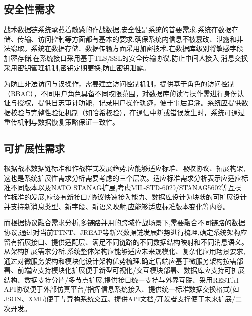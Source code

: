 \subsection{安全性需求}
战术数据链系统承载着敏感的作战数据,安全性是系统的首要需求,系统在数据存储、传输、访问控制等方面都有基本的要求,确保系统内信息不被篡改、泄露和非法窃取\cite{Collins_TTNT_immersion_2020}。系统在数据存储、数据传输方面采用加密技术,在数据库级别将敏感字段加密存储,在系统接口采用基于TLS/SSL的安全传输协议,防止中间人接入,消息交换采用密钥管理机制,密钥定期更换,防止密钥泄露\cite{Euromids_2025_contract}。

为防止非法访问与误操作，需要建立访问控制机制，提供基于角色的访问控制（RBAC），不同用户角色具备不同权限范围，对数据库的读写操作需进行身份认证与授权，提供日志审计功能，记录用户操作轨迹，便于事后追溯\cite{GovConWire_Euromids_2025}。系统应提供数据校验与完整性验证机制（如哈希校验），在通信中断或错误发生时，系统可通过重传机制与数据恢复策略保证一致性\cite{musumeci_2014_ietrsn_pulseblank,borio_2013_ietspr_pulseblanking,houdzoumis2009_jn,wu_2016_taes_dme_wp,huo_2015_ieeecl_meb,huo_2015_comex_mixed_interference,mitch_2016_nav_chirp_geolocation,vandermerwe_2023_nav_mpanf}。

\subsection{可扩展性需求}
根据战术数据链标准和作战样式发展趋势,应能够适应标准、吸收协议、拓展构架,这也是系统扩展性需求分析需要考虑的三个层次\cite{CJCS_Manuals_Library}。适应标准需求分析表示应适应标准不同版本以及NATO STANAG扩展,考虑MIL-STD-6020/STANAG5602等互操作标准的发展,应该有新接口/协议快速接入能力、数据库设计为块状的可扩展设计并支持新消息类型、新字段、新语义映射,应能够适应标准版本变化等内容\cite{CJCS_Instructions_Library,ASSIST_3011_2023}。

而根据协议融合需求分析,多链路并用的跨域作战场景下,需要融合不同链路的数据协议,通过对当前TTNT、JREAP等新兴数据链发展趋势进行梳理,确定系统架构应留有拓展接口、提供适配层、满足不同链路的不同数据结构映射和不同消息语义\cite{ASSIST_6020_2025,qin2013_gpssol}。从架构扩展需求分析,系统整体架构应能够适应未来规模化、复杂化应用场景要求,通过对微服务架构和模块化设计架构优势梳理,确定后端应基于微服务架构按需部署、前端应支持模块化扩展便于新型可视化/交互模块部署、数据库应支持可扩展结构、数据支持分片/多节点扩展\cite{fried_loeliger1979_navigation},提供接口统一支持与外界互联、采用RESTful API协议便于外部仿真平台/指挥信息系统接入、提供统一标准数据交换格式(如JSON、XML)便于与异构系统交互、提供API文档/开发者支撑便于未来扩展/二次开发\cite{baruffa2013_jsps}。